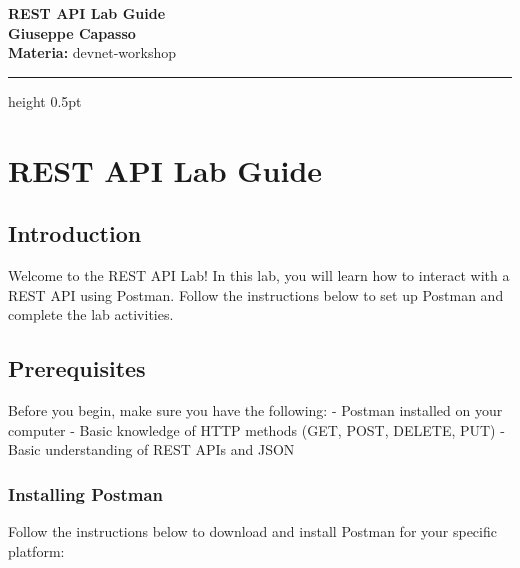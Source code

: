 \documentclass[11pt,a4paper]{article}
\newcommand{\proposaltitle}[1]{
    \begin{center}
        \vspace*{0.1cm}
        {\LARGE \bfseries \color{blue} #1} \\[1.5ex]
        {\large \textbf{Giuseppe Capasso}} \\[1ex]
                \small{
            \vspace{0.1cm}
            \textbf{Materia:} devnet-workshop\\
        }
            \end{center}
    \vspace{0.3cm}
    \hrule height 0.5pt
    \vspace{0.5cm}
}
\begin{document}
\proposaltitle{REST API Lab Guide}

\section{REST API Lab Guide}\label{rest-api-lab-guide}

\subsection{Introduction}\label{introduction}

Welcome to the REST API Lab! In this lab, you will learn how to interact
with a REST API using Postman. Follow the instructions below to set up
Postman and complete the lab activities.

\subsection{Prerequisites}\label{prerequisites}

Before you begin, make sure you have the following: - Postman installed
on your computer - Basic knowledge of HTTP methods (GET, POST, DELETE,
PUT) - Basic understanding of REST APIs and JSON

\subsubsection{Installing Postman}\label{installing-postman}

Follow the instructions below to download and install Postman for your
specific platform:
\end{document}
